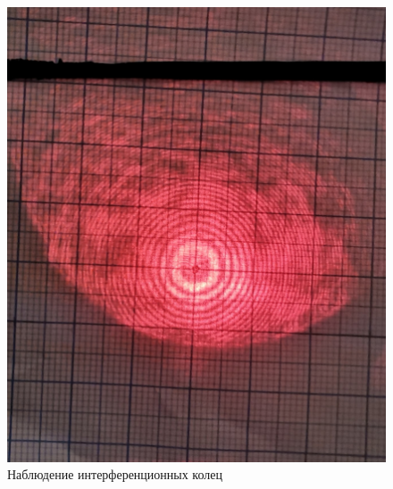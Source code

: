 \documentclass[15pt,a5paper,reqno]{article}
\begin{document}
 

\begin{figure}[h]
    \begin{minipage}[b]{0.4\textwidth}
        \includegraphics[width=\textwidth]{pics/rings.png}
        \caption{Наблюдение интерференционных колец}
    \end{minipage}
    \hfill
    \begin{minipage}[b]{0.4\textwidth}
  

\end{minipage}
\end{figure}
\end{document}
